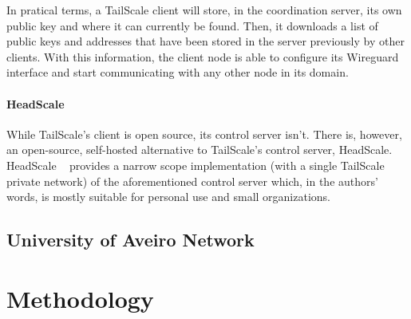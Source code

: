 \documentclass[11pt,twoside,a4paper]{report}
\begin{document}
In pratical terms, a TailScale client will store, in the coordination server, its own public key and where it can currently be found. Then, it downloads a list of public keys and addresses that have been stored in the server previously by other clients. With this information, the client node is able to configure its Wireguard interface and start communicating with any other node in its domain.


\subsubsection{HeadScale}

While TailScale's client is open source, its control server isn't. There is, however, an open-source, self-hosted alternative to TailScale's control server, HeadScale. HeadScale ~\cite{headscale2023online} provides a narrow scope implementation (with a single TailScale private network) of the aforementioned control server which, in the authors' words, is mostly suitable for personal use and small organizations.


\section{University of Aveiro Network}

\chapter{Methodology}
\label{chapter:method}



%
%
\cleardoublepage
\iffalse
\else






\cleardoublepage
\end{document}
